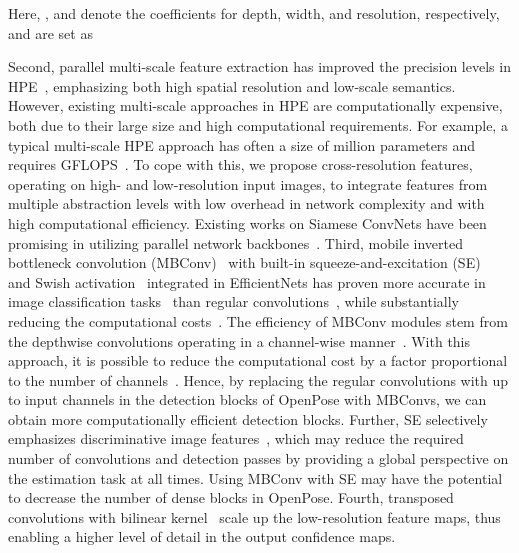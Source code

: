 Here, ,  and  denote the coefficients for depth, width, and resolution, respectively, and are set as

Second, parallel multi-scale feature extraction has improved the precision levels in HPE~\cite{newell2016stacked, ke2018multi, sun2019deep, yang2017learning}, emphasizing both high spatial resolution and low-scale semantics. However, existing multi-scale approaches in HPE are computationally expensive, both due to their large size and high computational requirements. For example, a typical multi-scale HPE approach has often a size of  million parameters and requires  GFLOPS~\cite{sun2019deep, chu2017multi, zhang2019human, tang2018deeply, yang2017learning, newell2016stacked, rafi2016efficient}. To cope with this, we propose cross-resolution features, operating on high- and low-resolution input images, to integrate features from multiple abstraction levels with low overhead in network complexity and with high computational efficiency. Existing works on Siamese ConvNets have been promising in utilizing parallel network backbones~\cite{gao2019siamese, gao2020learning}. 
Third, mobile inverted bottleneck convolution (MBConv)~\cite{sandler2018mobilenetv2} with built-in squeeze-and-excitation (SE)~\cite{hu2018squeeze} and Swish activation~\cite{DBLP:conf/iclr/RamachandranZL18} integrated in EfficientNets has proven more accurate in image classification tasks~\cite{tan2019efficientnet, tan2019mixconv} than regular convolutions~\cite{he2016deep, huang2017densely, szegedy2017inception}, while substantially reducing the computational costs~\cite{tan2019efficientnet}. The efficiency of MBConv modules stem from the depthwise convolutions operating in a channel-wise manner~\cite{sifre2014rigid}. With this approach, it is possible to reduce the computational cost by a factor proportional to the number of channels~\cite{tan2019mixconv}.
Hence, by replacing the regular  convolutions with up to  input channels in the detection blocks of OpenPose with MBConvs, we can obtain more computationally efficient detection blocks. Further, SE selectively emphasizes discriminative image features~\cite{hu2018squeeze}, which may reduce the required number of convolutions and detection passes by providing a global perspective on the estimation task at all times. Using MBConv with SE may have the potential to decrease the number of dense blocks in OpenPose. Fourth, transposed convolutions with bilinear kernel~\cite{long2015fully} scale up the low-resolution feature maps, thus enabling a higher level of detail in the output confidence maps. 

